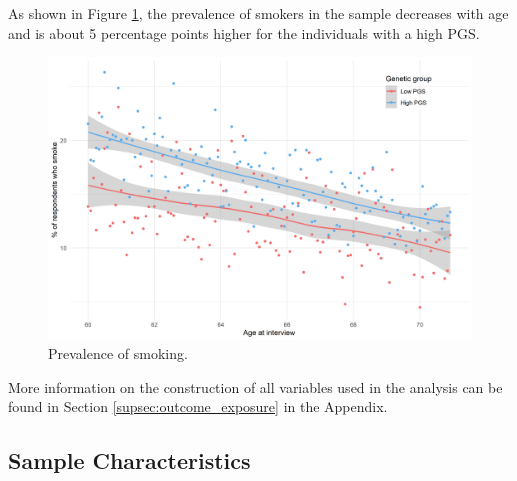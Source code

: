 \documentclass[11pt]{article}
\begin{document}
As shown in Figure \ref{fig:smoking}, the prevalence of smokers in the sample decreases with age and is about 5 percentage points higher for the individuals with a high PGS.

\begin{figure}[!ht]
	\begin{center}
	\includegraphics[width=.7\textwidth]
	{../3_output/over_time/graph_6070smokenplot_agebypgs.png}
	\caption{Prevalence of smoking.
	\label{fig:smoking}}
	\vspace{-0.8cm}
	\end{center}
\end{figure}


More information on the construction of all variables used in the analysis can be found in Section \ref{supsec:outcome_exposure} in the Appendix.


\subsection{Sample Characteristics}\label{sec:sumstats}
\end{document}
